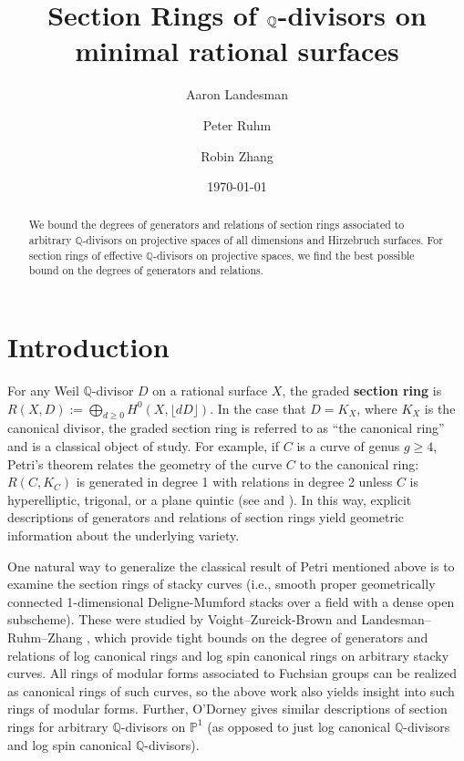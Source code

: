 \documentclass{amsart}
\title[Section Rings of $\bq$-divisors]{Section Rings of $\bq$-divisors on minimal rational surfaces}
\author{Aaron Landesman}
\author{Peter Ruhm}
\author{Robin Zhang}
\date{\today}
\theoremstyle{plain}
\theoremstyle{definition}
\theoremstyle{remark}
\numberwithin{equation}{section}
\newcommand\bq{{\mathbb Q}}
\newcommand\bp{{\mathbb P}}
\begin{document}
\begin{abstract}
 	We bound the degrees of generators and relations of
	section rings associated to arbitrary $\bq$-divisors on projective spaces of 
	all dimensions and Hirzebruch surfaces. For section rings of
	effective $\bq$-divisors on projective spaces, we find 
	the best possible bound on
	the degrees of generators and relations.
\end{abstract}

\maketitle

\section{Introduction}
\label{sec:intro}
For any Weil $\bq$-divisor $D$ on a rational surface $X$, the graded
\textbf{section ring} is $R(X, D) := \bigoplus_{d \geq 0}
H^0(X, \lfloor dD \rfloor)$.
In the case that $D = K_X$, where $K_X$ is the canonical divisor,
the graded section ring is referred to as
``the canonical ring'' and is a classical object of study.
For example, if $C$ is a curve of genus $g \geq 4$, Petri's theorem
relates the geometry of the curve $C$ to the canonical ring:
$R(C, K_C)$ is generated in degree 1 with relations in degree 2 
unless $C$ is hyperelliptic, trigonal, or a plane quintic
(see
\cite[p. 157]{saint-donat:proj} and \cite[Section 3.3]{acgh:algebraic-curves}).
In this way, explicit descriptions of generators and relations of section rings yield
geometric information about the underlying variety.

One natural way to generalize the classical result of Petri
mentioned above is to examine the section rings of stacky curves
(i.e., smooth proper geometrically connected 1-dimensional
Deligne-Mumford stacks over a field with a dense open subscheme).
These were studied by Voight--Zureick-Brown 
\cite{vzb:stacky} and Landesman--Ruhm--Zhang \cite{lrz:spin-cring},
which provide tight bounds on the degree of generators and relations
of log canonical rings and log spin canonical rings on arbitrary
stacky curves. All rings of modular forms associated to Fuchsian
groups can be realized as canonical rings of
such curves, so the above work also yields insight into such rings
of modular forms.
Further, 
O'Dorney \cite{dorney:canonical} gives similar descriptions
of section rings for arbitrary $\bq$-divisors on $\bp^1$
(as opposed to just log canonical $\bq$-divisors and log spin canonical $\bq$-divisors).
\end{document}
